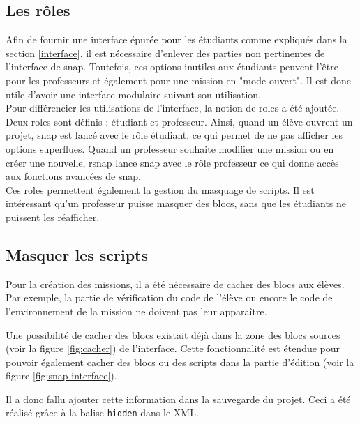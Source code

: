 \subsection{Les rôles}
\label{role}
Afin de fournir une interface épurée pour les étudiants comme expliqués dans la section \ref{interface}, il est nécessaire d'enlever des parties non pertinentes de l'interface de \gls{snap}. Toutefois, ces options inutiles aux étudiants peuvent l'être pour les professeurs et également pour une \gls{mission} en "mode ouvert". Il est donc utile d'avoir une interface modulaire suivant son utilisation. \\

Pour différencier les utilisations de l'interface, la notion de \glspl{role} a été ajoutée. Deux \glspl{role} sont définis : étudiant et professeur. Ainsi, quand un élève ouvrent un projet, \gls{snap} est lancé avec le rôle étudiant, ce qui permet de ne pas afficher les options superflues. Quand un professeur souhaite modifier une \gls{mission} ou en créer une nouvelle, \gls{rsnap} lance \gls{snap} avec le rôle professeur ce qui donne accès aux fonctions avancées de \gls{snap}.\\

Ces \glspl{role} permettent également la gestion du masquage de \glspl{script}. Il est intéressant qu'un professeur puisse masquer des \glspl{bloc}, sans que les étudiants ne puissent les réafficher.

\subsection{Masquer les scripts}
Pour la création des \glspl{mission}, il a été nécessaire de cacher des \glspl{bloc} aux élèves. Par exemple, la partie de vérification du code de l'élève ou encore le code de l'environnement de la \gls{mission} ne doivent pas leur apparaître.

Une possibilité de cacher des \glspl{bloc} existait déjà dans la zone des \glspl{bloc} sources (voir la figure \ref{fig:cacher}) de l'interface. Cette fonctionnalité est étendue pour pouvoir également cacher des \glspl{bloc} ou des \glspl{script} dans la partie d'édition (voir la figure \ref{fig:snap interface}).

Il a donc fallu ajouter cette information dans la sauvegarde du projet. Ceci a été réalisé grâce à la balise \texttt{hidden} dans le XML.\\


